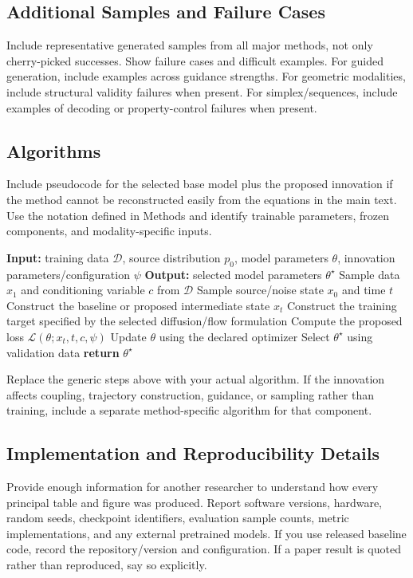 \documentclass{article}
\begin{document}
\subsection{Additional Samples and Failure Cases}

Include representative generated samples from all major methods, not only cherry-picked successes. Show failure cases and difficult examples. For guided generation, include examples across guidance strengths. For geometric modalities, include structural validity failures when present. For simplex/sequences, include examples of decoding or property-control failures when present.

\subsection{Algorithms}

Include pseudocode for the selected base model plus the proposed innovation if the method cannot be reconstructed easily from the equations in the main text. Use the notation defined in Methods and identify trainable parameters, frozen components, and modality-specific inputs.

\begin{algorithm}[H]
\caption{Generic training procedure for the proposed continuous generative model}
\label{alg:generic-train}
\begin{algorithmic}[1]
\State \textbf{Input:} training data $\mathcal{D}$, source distribution $p_0$, model parameters $\theta$, innovation parameters/configuration $\psi$
\State \textbf{Output:} selected model parameters $\theta^{\star}$
    \State Sample data $x_1$ and conditioning variable $c$ from $\mathcal{D}$
    \State Sample source/noise state $x_0$ and time $t$
    \State Construct the baseline or proposed intermediate state $x_t$
    \State Construct the training target specified by the selected diffusion/flow formulation
    \State Compute the proposed loss $\mathcal{L}(\theta; x_t,t,c,\psi)$
    \State Update $\theta$ using the declared optimizer
\EndFor
\State Select $\theta^{\star}$ using validation data
\State \textbf{return} $\theta^{\star}$
\end{algorithmic}
\end{algorithm}

Replace the generic steps above with your actual algorithm. If the innovation affects coupling, trajectory construction, guidance, or sampling rather than training, include a separate method-specific algorithm for that component.

\subsection{Implementation and Reproducibility Details}

Provide enough information for another researcher to understand how every principal table and figure was produced. Report software versions, hardware, random seeds, checkpoint identifiers, evaluation sample counts, metric implementations, and any external pretrained models. If you use released baseline code, record the repository/version and configuration. If a paper result is quoted rather than reproduced, say so explicitly.
\end{document}
